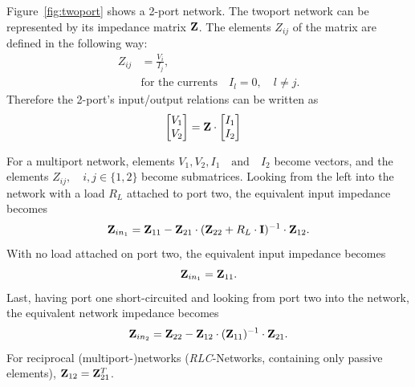 Figure~\ref{fig:twoport} shows a 2-port network.
The twoport network can be represented by its impedance matrix $\mathbf{Z}$.
The elements $Z_{ij}$ of the matrix are defined in the following way:
\begin{align}
\label{eq:multiport_impedance}
Z_{ij} &= \frac{V_i}{I_j},\\\nonumber
&\text{for the currents}\quad I_l = 0,\quad l\neq j.
\end{align}
Therefore the 2-port's input/output relations can be written as
\begin{align}
\label{eq:twoport_io}
\begin{bmatrix}
V_1\\V_2
\end{bmatrix} &= \mathbf{Z} \cdot
\begin{bmatrix}
I_1\\I_2
\end{bmatrix}
\end{align}

For a multiport network, elements $V_1,V_2,I_1\quad\text{and}\quad I_2$ become vectors, and the elements $Z_{ij},\quad i,j\in\{1,2\}$ become submatrices.
Looking from the left into the network with a load $R_L$ attached to port two, the equivalent input impedance becomes
\begin{equation}
\label{eq:eq_imp_load}
\mathbf{Z}_{in_1} = \mathbf{Z}_{11} - \mathbf{Z}_{21}\cdot(\mathbf{Z}_{22} + R_L\cdot\mathbf{I})^{-1}\cdot \mathbf{Z}_{12}.
\end{equation}
With no load attached on port two, the equivalent input impedance becomes
\begin{equation}
\label{eq:eq_imp_oc}
\mathbf{Z}_{in_1} = \mathbf{Z}_{11}.
\end{equation}
Last, having port one short-circuited and looking from port two into the network, the equivalent network impedance becomes
\begin{equation}
\label{eq:eq_imp_sc}
\mathbf{Z}_{in_2} = \mathbf{Z}_{22} - \mathbf{Z}_{12}\cdot(\mathbf{Z}_{11})^{-1}\cdot \mathbf{Z}_{21}.
\end{equation}
For reciprocal (multiport-)networks (\textit{RLC}-Networks, containing only passive elements), $\mathbf{Z}_{12} = \mathbf{Z}_{21}^T$.

